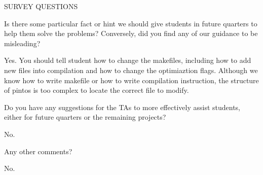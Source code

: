 \begin{aspect}{SURVEY QUESTIONS}
	\begin{qc}
		Is there some particular fact or hint we should give students in future quarters
		to help them solve the problems?
		Conversely, did you find any of our guidance to be misleading?
	\end{qc}
	Yes. You should tell student how to change the makefiles, including how to add new files into compilation and how to change the optimiaztion flags. Although we know how to write makefile or how to write compilation instruction, the structure of pintos is too complex to locate the correct file to modify.

	\begin{qc}
		Do you have any suggestions for the TAs to more effectively assist students,
		either for future quarters or the remaining projects?
	\end{qc}
	No.
	\begin{qc}
		Any other comments?
	\end{qc}
	No.
\end{aspect}



